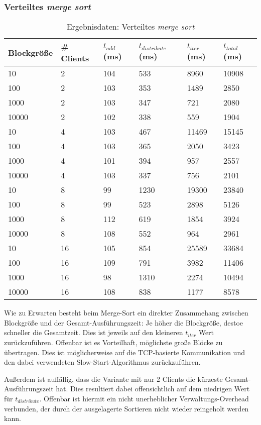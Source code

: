 \documentclass[fontsize=12pt,a4paper,headinclude=no,headings=small]{scrartcl}
\begin{document}
\subsubsection{Verteiltes \textit{merge sort}}
\begin{table}[htp]
\begin{tabularx}{\textwidth}{ |X|X|X|X|X|X| }
\hline
Blockgröße & \# Clients & $t_{add}$ (ms) & $t_{distribute}$ (ms) & $t_{iter}$ (ms) & $t_{total}$ (ms) \\
\hline
10 & 2 & 104 & 533 & 8960 & 10908 \\
100 & 2 & 103 & 353 & 1489 & 2850 \\
1000 & 2 & 103 & 347 & 721 & 2080 \\
10000 & 2 & 102 & 338 & 559 & 1904 \\
\hline
10 & 4 & 103 & 467 & 11469 & 15145 \\
100 & 4 & 103 & 365 & 2050 & 3423 \\
1000 & 4 & 101 & 394 & 957 & 2557 \\
10000 & 4 & 103 & 337 & 756 & 2101 \\
\hline
10 & 8 & 99 & 1230 & 19300 & 23840 \\
100 & 8 & 99 & 523 & 2898 & 5126 \\
1000 & 8 & 112 & 619 & 1854 & 3924 \\
10000 & 8 & 108 & 552 & 964 & 2961 \\
\hline
10 & 16 & 105 & 854 & 25589 & 33684 \\
100 & 16 & 109 & 791 & 3982 & 11406 \\
1000 & 16 & 98 & 1310 & 2274 & 10494 \\
10000 & 16 & 108 & 838 & 1177 & 8578 \\
\hline
\end{tabularx}
\caption{Ergebnisdaten: Verteiltes \textit{merge sort}}
\end{table}
Wie zu Erwarten besteht beim Merge-Sort ein direkter Zusammehang zwischen Blockgröße und der Gesamt-Ausführungszeit: Je höher die Blockgröße, destoe schneller die Gesamtzeit. Dies ist jeweils auf den kleineren $t_{iter}$ Wert zurückzuführen. Offenbar ist es Vorteilhaft, möglichste große Blöcke zu übertragen. Dies ist möglicherweise auf die TCP-basierte Kommunikation und den dabei verwendeten Slow-Start-Algorithmus zurückzuführen.
 
Außerdem ist auffällig, dass die Variante mit nur 2 Clients die kürzeste Gesamt-Ausführungszeit hat. Dies resultiert dabei offensichtlich auf dem niedrigen Wert für $t_{distribute}$. Offenbar ist hiermit ein nicht unerheblicher Verwaltungs-Overhead verbunden, der durch der ausgelagerte Sortieren nicht wieder reingeholt werden kann.
\end{document}
